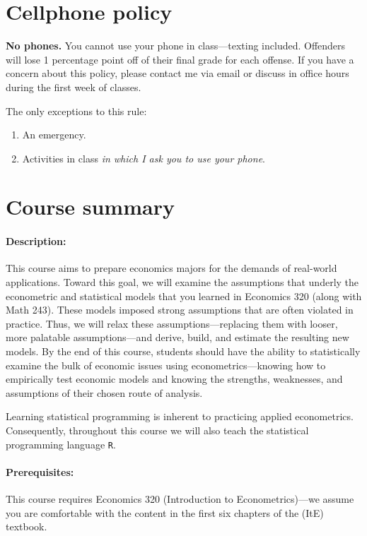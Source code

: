 \documentclass[10pt]{article}
\begin{document}
\section*{Cellphone policy}

\textbf{No phones.} You cannot use your phone in class---texting included. Offenders will lose 1 percentage point off of their final grade for each offense. If you have a concern about this policy, please contact me via email or discuss in office hours during the first week of classes.

\bigskip \noindent The only exceptions to this rule:
\begin{enumerate}
  \item An emergency.
  \item Activities in class \textit{in which I ask you to use your phone}.
\end{enumerate}

\section*{Course summary}

\paragraph{Description:} This course aims to prepare economics majors for the demands of real-world applications. Toward this goal, we will examine the assumptions that underly the econometric and statistical models that you learned in Economics 320 (along with Math 243). These models imposed strong assumptions that are often violated in practice. Thus, we will relax these assumptions---replacing them with looser, more palatable assumptions---and derive, build, and estimate the resulting new models. By the end of this course, students should have the ability to statistically examine the bulk of economic issues using econometrics---knowing how to empirically test economic models and knowing the strengths, weaknesses, and assumptions of their chosen route of analysis.

Learning statistical programming is inherent to practicing applied econometrics. Consequently, throughout this course we will also teach the statistical programming language \texttt{{R}}.

\paragraph{Prerequisites:} This course requires Economics 320 (Introduction to Econometrics)---we assume you are comfortable with the content in the first six chapters of the (ItE) textbook.
\end{document}
